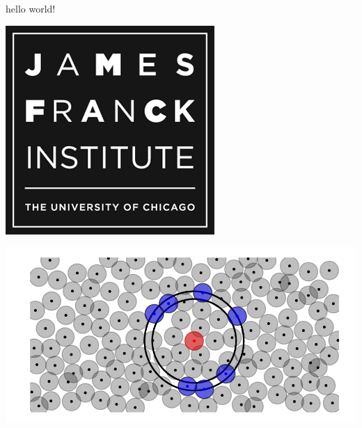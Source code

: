 \documentclass{article}
\begin{document}
hello world! 

\includegraphics[width=.1\linewidth]{figures/jfi_logo}

\includegraphics{figures/cartoon}
\end{document}
